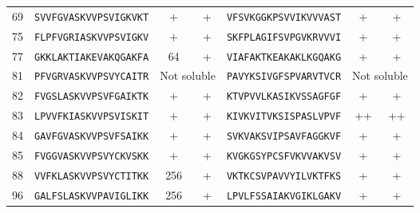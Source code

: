 \begin{table}[ptbh]
\begin{tabular}{llcclcc}
69  &  \texttt{SVVFGVASKVVPSVIGKVKT}  &  +  &  +  & \texttt{VFSVKGGKPSVVIKVVVAST}  &  +  &  + \\
\rowcolor[gray]{0.9}
75  &  \texttt{FLPFVGRIASKVVPSVIGKV}  &  +  &  +  & \texttt{SKFPLAGIFSVPGVKRVVVI}  &  +  &  + \\
77  &  \texttt{GKKLAKTIAKEVAKQGAKFA}  &  64  &  +  & \texttt{VIAFAKTKEAKAKLKGQAKG}  &  +  &  + \\
\rowcolor[gray]{0.9}
81  &  \texttt{PFVGRVASKVVPSVYCAITR}  &  \multicolumn{2}{c}{Not  soluble}  &  \texttt{PAVYKSIVGFSPVARVTVCR}  &  \multicolumn{2}{c}{Not  soluble}   \\
82  &  \texttt{FVGSLASKVVPSVFGAIKTK}  &  +  &  +  & \texttt{KTVPVVLKASIKVSSAGFGF}  &  +  &  + \\
\rowcolor[gray]{0.9}
83  &  \texttt{LPVVFKIASKVVPSVISKIT}  &  +  &  +  & \texttt{KIVKVITVKSISPASLVPVF}  &  ++  &  ++ \\
84  &  \texttt{GAVFGVASKVVPSVFSAIKK}  &  +  &  +  & \texttt{SVKVAKSVIPSAVFAGGKVF}  &  +  &  + \\
\rowcolor[gray]{0.9}
85  &  \texttt{FVGGVASKVVPSVYCKVSKK}  &  +  &  +  & \texttt{KVGKGSYPCSFVKVVAKVSV}  &  +  &  + \\
88  &  \texttt{VVFKLASKVVPSVYCTITKK}  &  256  &  +  & \texttt{VKTKCSVPAVVYILVKTFKS}  &  +  &  + \\
\rowcolor[gray]{0.9}
96  &  \texttt{GALFSLASKVVPAVIGLIKK}  &  256  &  +  & \texttt{LPVLFSSAIAKVGIKLGAKV}  &  +  &  + \\
\hline\hline
\end{tabular}
\end{table}
